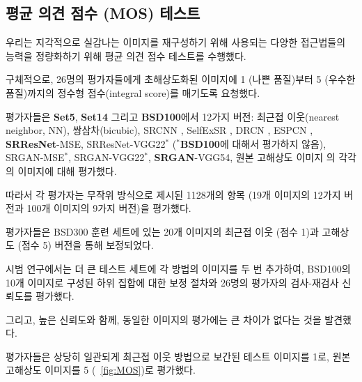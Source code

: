 \documentclass[10pt,twocolumn,letterpaper]{article}
\newcommand{\kor}[1]{#1}
\newcommand{\eng}[1]{}
\begin{document}
\subsection{\eng{Mean opinion score (MOS) testing}\kor{평균 의견 점수 (MOS) 테스트}}
\eng{
We have performed a \ac{MOS} test to quantify the ability of different approaches to reconstruct perceptually convincing images.
}\kor{
우리는 지각적으로 실감나는 이미지를 재구성하기 위해 사용되는 다양한 접근법들의 능력을 정량화하기 위해 \ac{평균 의견 점수} 테스트를 수행했다.
} \eng{
Specifically, we asked 26 raters to assign an integral score from 1 (bad quality) to 5 (excellent quality) to the super-resolved images.
}\kor{
구체적으로, 26명의 평가자들에게 초해상도화된 이미지에 1 (나쁜 품질)부터 5 (우수한 품질)까지의 정수형 점수(integral score)를 매기도록 요청했다.
} \eng{
The raters rated 12 versions of each image on \textbf{Set5}, \textbf{Set14} and \textbf{BSD100}: nearest neighbor (NN), bicubic, SRCNN \cite{dong2014learning}, SelfExSR \cite{Huang15selfexemplars}, DRCN \cite{kim2016deeply}, ESPCN \cite{Shi2016ESPCN}, \textbf{SRResNet}-MSE, SRResNet-VGG22$^\ast$ ($^\ast$not rated on \textbf{BSD100}), SRGAN-MSE$^\ast$, SRGAN-VGG22$^\ast$, \textbf{SRGAN}-VGG54 and the original HR image.
}\kor{
평가자들은 \textbf{Set5}, \textbf{Set14} 그리고 \textbf{BSD100}에서 12가지 버전: 최근접 이웃(nearest neighbor, NN), 쌍삼차(bicubic), SRCNN \cite{dong2014learning}, SelfExSR \cite{Huang15selfexemplars}, DRCN \cite{kim2016deeply}, ESPCN \cite{Shi2016ESPCN}, \textbf{SRResNet}-MSE, SRResNet-VGG22$^\ast$ ($^\ast$\textbf{BSD100}에 대해서 평가하지 않음), SRGAN-MSE$^\ast$, SRGAN-VGG22$^\ast$, \textbf{SRGAN}-VGG54, 원본 고해상도 이미지 의 각각의 이미지에 대해 평가했다.
} \eng{
Each rater thus rated 1128 instances (12 versions of 19 images plus 9 versions of 100 images) that were presented in a randomized fashion.
}\kor{
따라서 각 평가자는 무작위 방식으로 제시된 1128개의 항목 (19개 이미지의 12가지 버전과 100개 이미지의 9가지 버전)을 평가했다.
}
\eng{
The raters were calibrated on the NN (score 1) and HR (5) versions of 20 images from the BSD300 training set.
}\kor{
평가자들은 BSD300 훈련 세트에 있는 20개 이미지의 최근접 이웃 (점수 1)과 고해상도 (점수 5) 버전을 통해 보정되었다.
} \eng{
In a pilot study we assessed the calibration procedure and the test-retest reliability of 26 raters on a subset of 10 images from BSD100 by adding a method's images twice to a larger test set.
}\kor{
시범 연구에서는 더 큰 테스트 세트에 각 방법의 이미지를 두 번 추가하여, BSD100의 10개 이미지로 구성된 하위 집합에 대한 보정 절차와 26명의 평가자의 검사-재검사 신뢰도를 평가했다.
} \eng{
We found good reliability and no significant differences between the ratings of the identical images.
}\kor{
그리고, 높은 신뢰도와 함께, 동일한 이미지의 평가에는 큰 차이가 없다는 것을 발견했다.
}
\eng{
Raters very consistently rated NN interpolated test images as 1 and the original HR images as 5 (\cf \figurename~\ref{fig:MOS}).
}\kor{
평가자들은 상당히 일관되게 최근접 이웃 방법으로 보간된 테스트 이미지를 1로, 원본 고해상도 이미지를 5 (\cf \figurename~\ref{fig:MOS})로 평가했다.
}
\end{document}
